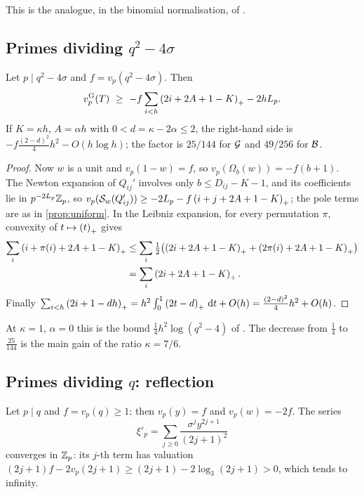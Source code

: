 This is the analogue, in the binomial normalisation, of \cite[Lemma~4.2]{Krisman2026chi2}.

\subsection{Primes dividing \texorpdfstring{$q^2-4\sigma$}{q²-4σ}}\label{subsec:p-divides-Y}

\begin{proposition}\label{prop:p-divides-Y}
Let $p\mid q^2-4\sigma$ and $f=v_p(q^2-4\sigma)$. Then
\[
  \vG p(T)\ \ge\ -f\sum_{i<h}\pos{2i+2A+1-K}-2hL_p .
\]
If $K=\kappa h$, $A=\alpha h$ with $0<d=\kappa-2\alpha\le2$, the right-hand side is
$-f\frac{(2-d)^2}{4}h^2-O(h\log h)$; the factor is $25/144$ for $\mathcal{G}$ and $49/256$ for $\mathcal{B}$.
\end{proposition}

\begin{proof}
Now $w$ is a unit and $v_p(1-w)=f$, so $v_p(\Omega_b(w))=-f(b+1)$. The Newton expansion of
$Q_{ij}'$ involves only $b\le D_{ij}-K-1$, and its coefficients lie in $p^{-2L_p}\mathbb{Z}_p$, so
$v_p(\mathcal{S}_w(Q_{ij}'))\ge-2L_p-f\left(i+j+2A+1-K\right)_{+}$; the pole terms are as in
\cref{prop:uniform}. In the Leibniz expansion, for every permutation $\pi$, convexity of
$t\mapsto\left(t\right)_{+}$ gives
\begin{align*}
  \sum_i\left(i+\pi(i)+2A+1-K\right)_{+}
  &\le\sum_i\tfrac12\bigl(\left(2i+2A+1-K\right)_{+}+\left(2\pi(i)+2A+1-K\right)_{+}\bigr)\\
  &=\sum_i\left(2i+2A+1-K\right)_{+}.
\end{align*}
Finally $\sum_{i<h}\left(2i+1-dh\right)_{+}=h^2\int_0^1\left(2t-d\right)_{+}\,\mathrm{d} t+O(h)=\frac{(2-d)^2}4h^2+O(h)$.
\end{proof}

At $\kappa=1$, $\alpha=0$ this is the bound $\frac14h^2\log(q^2-4)$ of
\cite[Lemma~5.1, Thm.~5.3]{Krisman2026chi2}. The decrease from $\frac14$ to $\frac{25}{144}$
is the main gain of the ratio $\kappa=7/6$.

\subsection{Primes dividing \texorpdfstring{$q$}{q}: reflection}\label{subsec:p-divides-q}

Let $p\mid q$ and $f=v_p(q)\ge1$; then $v_p(y)=f$ and $v_p(w)=-2f$. The series
\[
  \xi'_p=\sum_{j\ge0}\frac{\sigma^jy^{2j+1}}{(2j+1)^2}
\]
converges in $\mathbb{Z}_p$: its $j$-th term has valuation $(2j+1)f-2v_p(2j+1)\ge(2j+1)-2\log_3(2j+1)>0$,
which tends to infinity.

